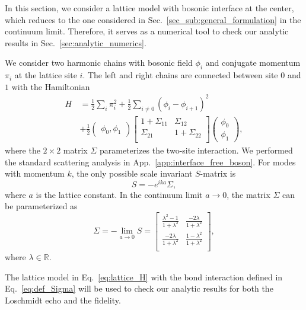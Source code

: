 
In this section, we consider a lattice model with bosonic interface at the center\cite{peschel_exact_2012,calabrese_entanglement_2012}, which reduces to the one considered in Sec.~\ref{sec_sub:general_formulation} in the continuum limit\cite{sakai_entanglement_2008}. Therefore, it serves as a numerical tool to check our analytic results in Sec.~\ref{sec:analytic_numerics}. 


We consider two harmonic chains with bosonic field $\phi_i$ and conjugate momentum $\pi_i$ at the lattice site $i$. The left and right chains are connected between site $0$ and $1$ with the Hamiltonian
\begin{equation}
\begin{aligned}
\label{eq:lattice_H}
H &= \frac{1}{2} \sum_i \pi_i^2  +  \frac{1}{2} \sum_{i\ne 0 }  ( \phi_i - \phi_{i+1} )^2 \\
\quad & + \frac{1}{2} \begin{pmatrix}  \phi_0, \phi_1 \end{pmatrix}
\begin{bmatrix}
1 + \Sigma_{11}  & \Sigma_{12} \\
\Sigma_{21} &  1 + \Sigma_{22} \\
\end{bmatrix}
\begin{pmatrix}
\phi_0 \\
\phi_1 
\end{pmatrix},
\end{aligned}
\end{equation}
where the $2\times2$ matrix $\Sigma$ parameterizes the two-site interaction. We performed the standard scattering analysis in App.~\ref{app:interface_free_boson}. For modes with momentum $k$, the only possible scale invariant $S$-matrix is
\begin{equation}
S = - e^{ika} \Sigma,
\end{equation}
where $a$ is the lattice constant. In the continuum limit $a\rightarrow0$, the matrix $\Sigma$ can be parameterized as
\begin{equation}
\label{eq:def_Sigma}
\Sigma = -\lim_{a \rightarrow 0 } S = 
\begin{bmatrix}
\frac{\lambda^2- 1}{1 + \lambda^2} & \frac{-2\lambda }{1 + \lambda^2} \\
\frac{-2\lambda }{1 + \lambda^2} & \frac{1- \lambda^2}{1 + \lambda^2} \\
\end{bmatrix},
\end{equation}
where $\lambda\in\mathbb{R}$. 

The lattice model in Eq.~\eqref{eq:lattice_H} with the bond interaction defined in Eq.~\eqref{eq:def_Sigma} will be used to check our analytic results for both the Loschmidt echo and the fidelity.



